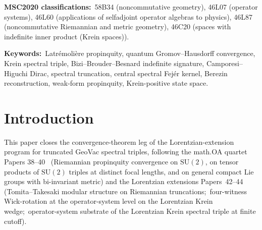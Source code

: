 \documentclass[11pt,a4paper]{article}
\theoremstyle{plain}
\theoremstyle{definition}
\newcommand{\Nt}{N_{t}}
\newcommand{\Krein}{\mathcal{K}}
\newcommand{\SU}{\mathrm{SU}}
\newcommand{\DGV}{D_{\mathrm{GV}}}
\newcommand{\DL}{D_{L}}
\newcommand{\Lprop}{\Lambda^{L}}
\newcommand{\Cthreejoint}{C_{3}^{\mathrm{joint}}}
\newcommand{\CthreeSU}{C_{3}^{\SU(2)}}
\newcommand{\Kplus}{\Krein^{+}}
\begin{document}
\begin{abstract}
momentum-polynomial convention for temporal multipliers, the joint
commutator $[\DL, a_{s} \otimes a_{t}]$ reduces \emph{bit-exactly} to
$i[\DGV, a_{s}] \otimes a_{t}$, so the temporal direction
contributes nothing to the joint Lipschitz comparison; the joint
$\Cthreejoint$ equals the spatial $\CthreeSU$ verbatim. The
Riemannian limit at $\Nt = 1$ reduces $\Lprop$ to Paper~38's bound
bit-exactly (load-bearing falsifier). To our knowledge this is the
first Lorentzian propinquity convergence theorem on truncated Krein
spectral triples in the published math.OA literature.
Honest scope:\ the construction is a \emph{weak-form} propinquity on
the $\Kplus$ Hilbert-space restriction;\ a \emph{strong-form}
Latr\'emoli\`ere-style metric on Krein-signature spectral triples
without $\Kplus$ restriction remains an open NCG-math problem. The
adjacent synthetic Lorentzian Gromov--Hausdorff program of
Mondino--S\"amann~\cite{mondino_samann2025} lives on a categorically
different mathematical object (pre-length spaces with causal diamonds,
not operator-algebraic spectral triples).
\end{abstract}

\bigskip\noindent
\textbf{MSC2020 classifications:}\ 58B34 (noncommutative geometry),
46L07 (operator systems), 46L60 (applications of selfadjoint operator
algebras to physics), 46L87 (noncommutative Riemannian and metric
geometry), 46C20 (spaces with indefinite inner product (Krein spaces)).

\medskip\noindent
\textbf{Keywords:}\ Latr\'emoli\`ere propinquity, quantum
Gromov--Hausdorff convergence, Krein spectral triple,
Bizi--Brouder--Besnard indefinite signature, Camporesi--Higuchi Dirac,
spectral truncation, central spectral Fej\'er kernel, Berezin
reconstruction, weak-form propinquity, Krein-positive state space.

\section{Introduction}\label{sec:intro}

This paper closes the convergence-theorem leg of the
Lorentzian-extension program for truncated GeoVac spectral triples,
following the math.OA quartet Papers
38--40~\cite{paper38,paper39,paper40_unified} (Riemannian propinquity
convergence on $\SU(2)$, on tensor products of $\SU(2)$ triples at
distinct focal lengths, and on general compact Lie groups with
bi-invariant metric) and the Lorentzian extensions
Papers~42--44~\cite{paper42,paper43,paper44} (Tomita--Takesaki modular
structure on Riemannian truncations;\ four-witness Wick-rotation at
the operator-system level on the Lorentzian Krein wedge;\ operator-system
substrate of the Lorentzian Krein spectral triple at finite cutoff).
\end{document}
